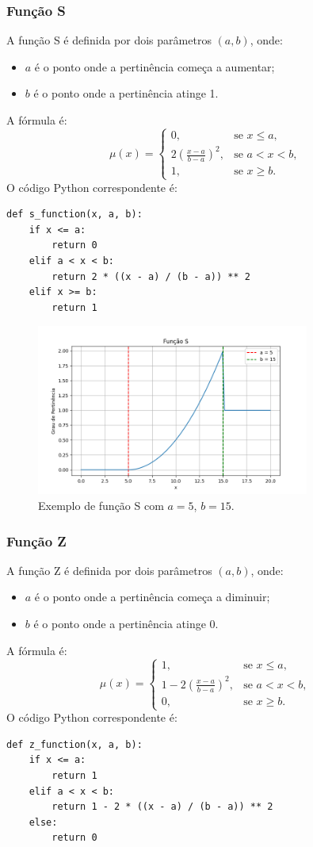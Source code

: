 \documentclass[a4paper,12pt]{article}
\begin{document}
\subsubsection{Função S}
A função S é definida por dois parâmetros $(a, b)$, onde:
\begin{itemize}
    \item $a$ é o ponto onde a pertinência começa a aumentar;
    \item $b$ é o ponto onde a pertinência atinge 1.
\end{itemize}
A fórmula é:
\[
\mu(x) =
\begin{cases}
0, & \text{se } x \leq a, \\
2\left(\frac{x - a}{b - a}\right)^2, & \text{se } a < x < b, \\
1, & \text{se } x \geq b.
\end{cases}
\]
O código Python correspondente é:
\begin{verbatim}
def s_function(x, a, b):
    if x <= a:
        return 0
    elif a < x < b:
        return 2 * ((x - a) / (b - a)) ** 2
    elif x >= b:
        return 1
\end{verbatim}
\begin{figure}[H]
    \centering
    \includegraphics[width=0.8\textwidth]{img/s.png}
    \caption{Exemplo de função S com $a=5$, $b=15$.}
\end{figure}

\subsubsection{Função Z}
A função Z é definida por dois parâmetros $(a, b)$, onde:
\begin{itemize}
    \item $a$ é o ponto onde a pertinência começa a diminuir;
    \item $b$ é o ponto onde a pertinência atinge 0.
\end{itemize}
A fórmula é:
\[
\mu(x) =
\begin{cases}
1, & \text{se } x \leq a, \\
1 - 2\left(\frac{x - a}{b - a}\right)^2, & \text{se } a < x < b, \\
0, & \text{se } x \geq b.
\end{cases}
\]
O código Python correspondente é:
\begin{verbatim}
def z_function(x, a, b):
    if x <= a:
        return 1
    elif a < x < b:
        return 1 - 2 * ((x - a) / (b - a)) ** 2
    else:
        return 0
\end{verbatim}
\end{document}

